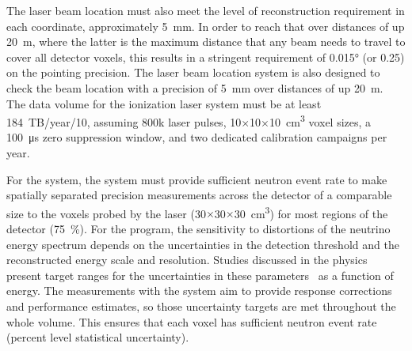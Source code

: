 The laser beam location must also meet the level of reconstruction requirement in each coordinate, approximately \SI{5}{\milli\m}. In order to reach that over distances of up \SI{20}{\m}, where the latter is the maximum distance that any beam needs to travel to cover all detector voxels, this results in a stringent requirement of \ang{0.015} (or \SI{0.25}{\mrad}) on the pointing precision. The laser beam location system is also designed to check the beam location with a precision of \SI{5}{\milli\m} over distances of up \SI{20}{\m}.
The data volume for the ionization laser system must be at least \num{184}~TB/year/\SI{10}{\kt}, assuming \num{800}k laser pulses, \num{10}$\times$\num{10}$\times$\SI{10}{\cubic\cm} voxel sizes, a \SI{100}{\micro\s} zero suppression window, and two dedicated calibration campaigns per year.

For the  system, the system must provide sufficient neutron event rate to make spatially separated precision measurements across the detector of a comparable size to the voxels probed by the laser (\num{30}$\times$\num{30}$\times$\SI{30}{\cubic\cm}) for most regions of the detector (\SI{75}{\%}). 
For the  program, the sensitivity to distortions of the neutrino energy spectrum depends on the uncertainties in the detection threshold and the reconstructed energy scale and resolution. Studies discussed in the physics  present target ranges for the uncertainties in these parameters~\cite{bib:docdb14068} as a function of energy. The measurements with the  system aim to provide response corrections and performance estimates, so those uncertainty targets are met throughout the whole volume. This ensures that each voxel has sufficient neutron event rate (percent level statistical uncertainty).

